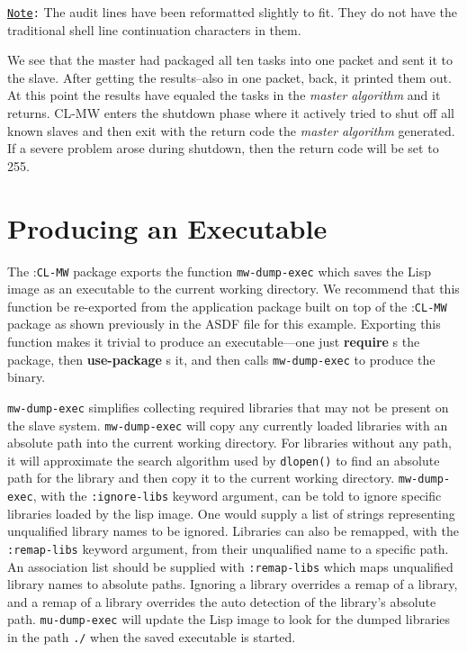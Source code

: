 \documentclass[titlepage,12pt]{book}
\newcommand{\xsmall}{\latexhtml{\small}{}}
\newcommand{\xnormalsize}{\latexhtml{\normalsize}{}}
\newcommand{\clmw}{\xsmall\textsc{CL-MW}\xnormalsize\xspace}
\newcommand{\package}[1]{\mbox{:\uppercase{\xsmall\texttt{#1}\xnormalsize}} package\xspace}
\newcommand{\mwpackage}{\package{CL-MW}}
\newcommand{\ma}{\textit{master algorithm}\xspace}
\newcommand{\func}[1]{\mbox{\texttt{#1}}\xspace}
\newcommand{\syscall}[1]{\mbox{\texttt{#1()}}\xspace}
\newcommand{\file}[1]{\texttt{#1}\xspace}
\newcommand{\bold}[1]{\textbf{#1}\xspace}
\newcommand{\keyword}[1]{\texttt{:#1}\xspace}
\newcommand{\Note}{\texttt{\underline{Note}:}\xspace}
\begin{document}
\Note The audit lines have been reformatted slightly to fit. They do
not have the traditional shell line continuation characters in them.

We see that the master had packaged all ten tasks into one packet and
sent it to the slave. After getting the results--also in one packet,
back, it printed them out. At this point the results have equaled
the tasks in the \ma and it returns. \clmw enters the shutdown
phase where it actively tried to shut off all known slaves and then
exit with the return code the \ma generated. If a severe problem
arose during shutdown, then the return code will be set to 255.

\section{Producing an Executable}

The \mwpackage exports the function \func{mw-dump-exec} which saves
the Lisp image as an executable to the current working directory. We
recommend that this function be re-exported from the application
package built on top of the \mwpackage as shown previously in the
ASDF file for this example. Exporting this function makes it trivial
to produce an executable---one just \bold{require}s the package,
then \bold{use-package}s it, and then calls \func{mw-dump-exec}
to produce the binary. 

\func{mw-dump-exec} simplifies collecting required libraries that
may not be present on the slave system.  \func{mw-dump-exec} will
copy any currently loaded libraries with an absolute path into the
current working directory. For libraries without any path, it will
approximate the search algorithm used by \syscall{dlopen} to find an
absolute path for the library and then copy it to the current working
directory. \func{mw-dump-exec}, with the \keyword{ignore-libs} keyword
argument, can be told to ignore specific libraries loaded by the lisp
image. One would supply a list of strings representing unqualified
library names to be ignored. Libraries can also be remapped, with
the \keyword{remap-libs} keyword argument, from their unqualified
name to a specific path. An association list should be supplied
with \keyword{remap-libs} which maps unqualified library names to
absolute paths. Ignoring a library overrides a remap of a library,
and a remap of a library overrides the auto detection of the library's
absolute path.  \func{mu-dump-exec} will update the Lisp image to
look for the dumped libraries in the path \file{./} when the saved
executable is started.
\end{document}
